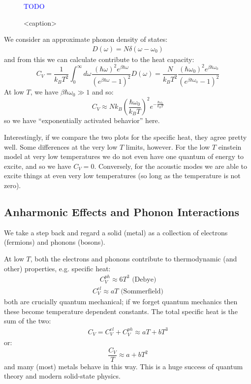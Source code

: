 \begin{figure}[htbp]
    \centering
    \textcolor{blue}{TODO}
    \caption{<caption>}
    \label{<label>}
\end{figure}


We consider an approximate phonon density of states:
\begin{align*}
    D(\omega) = N\delta(\omega - \omega_0)
\end{align*}
and from this we can calculate contribute to the heat capacity:
\begin{equation}
    C_V = \frac{1}{k_B T^2}\int_0^\infty d\omega\frac{(\hbar\omega)^2 e^{\beta\hbar\omega}}{(e^{\beta\hbar\omega} - 1)^2}D(\omega) = \frac{N}{k_BT^2}\frac{(\hbar\omega_0)^2 e^{\beta\hbar\omega_0}}{(e^{\beta\hbar\omega_0} - 1)^2}
\end{equation}
At low $T$, we have $\beta\hbar\omega_0 \gg 1$ and so:
\begin{equation}
    C_V \approx N k_B\left(\frac{\hbar\omega_0}{k_B T}\right)^2 e^{-\frac{\hbar\omega_0}{k_B T}}
\end{equation}
so we have ``exponentially activated behavior'' here.

Interestingly, if we compare the two plots for the specific heat, they agree pretty well. Some differences at the very low $T$ limits, however. For the low $T$ einstein model at very low temperatures we do not even have one quantum of energy to excite, and so we have $C_V = 0$. Conversely, for the acoustic modes we are able to excite things at even very low temperatures (so long as the temperature is not zero).

\subsection{Anharmonic Effects and Phonon Interactions}
We take a step back and regard a solid (metal) as a collection of electrons (fermions) and phonons (bosons).

At low $T$, both the electrons and phonons contribute to thermodynamic (and other) properties, e.g. specific heat:
\begin{align*}
    C_V^{ph} \approx 6T^3 \text{ (Debye)}
\end{align*}
\begin{align*}
    C_V^{el} \approx aT \text{ (Sommerfield)}
\end{align*}
both are crucially quantum mechanical; if we forget quantum mechanics then these become temperature dependent constants. The total specific heat is the sum of the two:
\begin{align*}
    C_V = C^{el}_V + C^{ph}_V \approx aT + bT^3
\end{align*}
or:
\begin{equation}
    \frac{C_V}{T} \approx a + bT^2
\end{equation}
and many (most) metals behave in this way. This is a huge success of quantum theory and modern solid-state physics.

